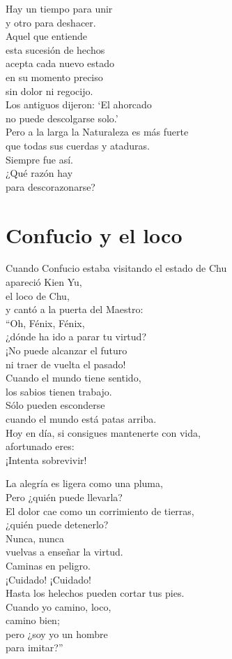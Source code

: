 \documentclass[book,b5paper,hidelinks,final]{memoir}
\begin{document}
	Hay un tiempo para unir\\
	y otro para deshacer.\\
	Aquel que entiende\\
	esta sucesión de hechos\\
	acepta cada nuevo estado\\
	en su momento preciso\\
	sin dolor ni regocijo.\\
	Los antiguos dijeron: `El ahorcado\\
	no puede descolgarse solo.'\\
	Pero a la larga la Naturaleza es más fuerte\\
	que todas sus cuerdas y ataduras.\\
	Siempre fue así.\\
	¿Qué razón hay\\
	para descorazonarse?
	
	\chapter*{Confucio y el loco}
	
	Cuando Confucio estaba visitando el estado de Chu\\
	apareció Kien Yu,\\
	el loco de Chu,\\
	y cantó a la puerta del Maestro:\\
	``Oh, Fénix, Fénix,\\
	¿dónde ha ido a parar tu virtud?\\
	¡No puede alcanzar el futuro\\
	ni traer de vuelta el pasado!\\
	Cuando el mundo tiene sentido,\\
	los sabios tienen trabajo.\\
	Sólo pueden esconderse\\
	cuando el mundo está patas arriba.\\
	Hoy en día, si consigues mantenerte con vida,\\
	afortunado eres:\\
	¡Intenta sobrevivir!
	
	La alegría es ligera como una pluma,\\
	Pero ¿quién puede llevarla?\\
	El dolor cae como un corrimiento de tierras,\\
	¿quién puede detenerlo?\\
	Nunca, nunca\\
	vuelvas a enseñar la virtud.\\
	Caminas en peligro.\\
	¡Cuidado! ¡Cuidado!\\
	Hasta los helechos pueden cortar tus pies.\\
	Cuando yo camino, loco,\\
	camino bien;\\
	pero ¿soy yo un hombre\\
	para imitar?''
	
\end{document}
